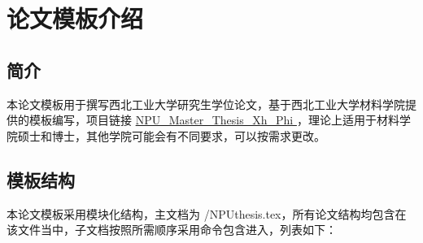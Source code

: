 \chapter{论文模板介绍}

\section{简介}
本论文模板用于撰写西北工业大学研究生学位论文，基于西北工业大学材料学院提供的模板编写，项目链接 \href{https://github.com/WuhenPhi/NPU_Master_Thesis_Xh_Phi}{NPU\_Master\_Thesis\_Xh\_Phi
} ，理论上适用于材料学院硕士和博士，其他学院可能会有不同要求，可以按需求更改。

\section{模板结构}
本论文模板采用模块化结构，主文档为 /NPUthesis.tex，所有论文结构均包含在该文件当中，子文档按照所需顺序采用命令包含进入，列表如下：
